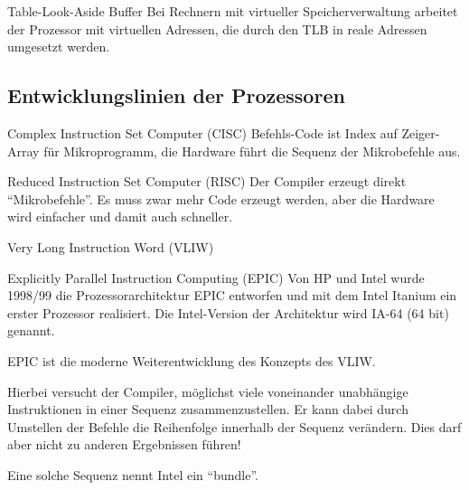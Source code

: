 \begin{defi}{Table-Look-Aside Buffer}
    Bei Rechnern mit virtueller Speicherverwaltung arbeitet der Prozessor mit virtuellen Adressen,
    die durch den TLB in reale Adressen umgesetzt werden.
\end{defi}

\subsection{Entwicklungslinien der Prozessoren}\label{subsec:entwicklungslinien-der-prozessoren}

\begin{defi}{Complex Instruction Set Computer (CISC)}
    Befehls-Code ist Index auf Zeiger-Array für Mikroprogramm,
    die Hardware führt die Sequenz der Mikrobefehle aus.
\end{defi}

\begin{defi}{Reduced Instruction Set Computer (RISC)}
    Der Compiler erzeugt direkt \enquote{Mikrobefehle}.
    Es muss zwar mehr Code erzeugt werden,
    aber die Hardware wird einfacher und damit auch schneller.
\end{defi}

\begin{defi}{Very Long Instruction Word (VLIW)}
\end{defi}

\begin{defi}{Explicitly Parallel Instruction Computing (EPIC)}
    Von HP und Intel wurde 1998/99 die Prozessorarchitektur EPIC entworfen
    und mit dem Intel Itanium ein erster Prozessor realisiert.
    Die Intel-Version der Architektur wird IA-64 (64 bit) genannt.

    EPIC ist die moderne Weiterentwicklung des Konzepts des VLIW.

    Hierbei versucht der Compiler,
    möglichst viele voneinander unabhängige Instruktionen in einer Sequenz zusammenzustellen.
    Er kann dabei durch Umstellen der Befehle die Reihenfolge innerhalb der Sequenz verändern.
    Dies darf aber nicht zu anderen Ergebnissen führen!

    Eine solche Sequenz nennt Intel ein “bundle”.
\end{defi}